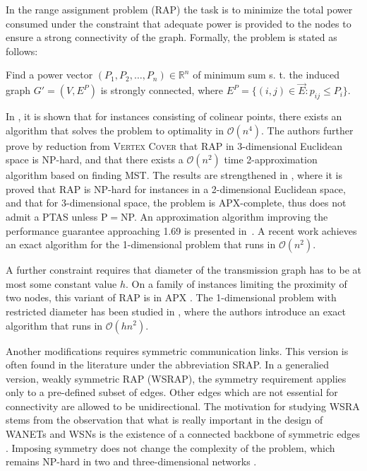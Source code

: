 In the range assignment problem (RAP) the task is to minimize the total power consumed under the constraint 
that adequate power is provided to the nodes to ensure a strong connectivity of the graph.
Formally, the problem is stated as follows:
\begin{problem}
Find a power vector $(P_1,P_2,\dots,P_n)\in\mathbb{R}^n$ of minimum sum s. t. the induced graph $G'=(V,E^P)$ is strongly connected, 
where $E^P=\{(i,j)\in \vec{E}: p_{ij}\leq P_i\}$.
\end{problem}
In \cite{kirousis00}, it is shown that for instances consisting of colinear points, there exists an algorithm that solves the problem to optimality in $\mathcal{O}(n^4)$.
The authors further prove by reduction from \textsc{Vertex Cover} that RAP in 3-dimensional Euclidean space is NP-hard,
and that there exists a $\mathcal{O}(n^2)$ time 2-approximation algorithm based on finding MST.
The results are strengthened in \cite{clementi99}, where it is proved that RAP is NP-hard for instances in a 2-dimensional Euclidean space, 
and that for 3-dimensional space, the problem is APX-complete, thus does not admit a PTAS unless P$=$NP.
An approximation algorithm improving the performance guarantee approaching 1.69 is presented in~\cite{calinescu02}.
A recent work \cite{carmi15} achieves an exact algorithm for the 1-dimensional problem that runs in $\mathcal{O}(n^2)$.


A further constraint requires that diameter of the transmission graph has to be at most some constant value $h$.
On a family of instances limiting the proximity of two nodes, this variant of RAP is in APX \cite{clementi01b}.
The 1-dimensional problem with restricted diameter has been studied in \cite{clementi03}, where the authors introduce an exact algorithm that runs in $\mathcal{O}(hn^2)$.

Another modifications requires symmetric communication links.
This version is often found in the literature under the abbreviation SRAP.
In a generalied version, weakly symmetric RAP (WSRAP), the symmetry requirement applies only to a pre-defined subset of edges.
Other edges which are not essential for connectivity are allowed to be unidirectional.
The motivation for studying WSRA stems from the observation that what is really important in the design of WANETs and WSNs is the existence of a connected backbone of symmetric edges \cite{santi05}.
Imposing symmetry does not change the complexity of the problem, which remains NP-hard in two and three-dimensional networks \cite{blough02}.

